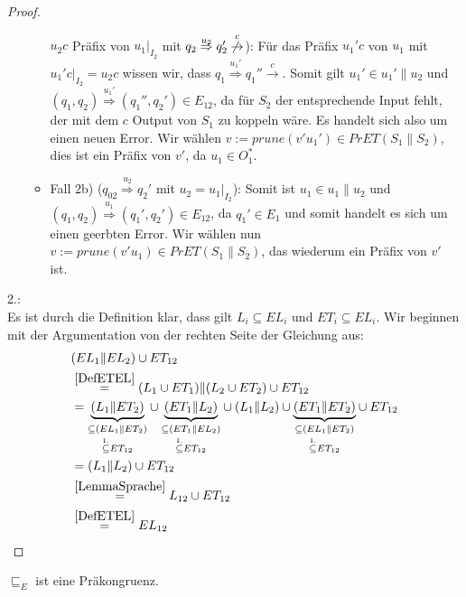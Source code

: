 \begin{proof}
\begin{itemize}
\begin{itemize}
        $u_2c$ Präfix von $u_1|_{I_2}$ mit $q_2 \overset{u_2}{\Rightarrow} q_2'
        \overset{c}{\not{\hspace{-0.1cm}\rightarrow}}$): Für das Präfix $u_1'c$
        von $u_1$ mit $u_1'c|_{I_2}=u_2c$ wissen wir, dass $q_1
        \overset{u_1'}{\Rightarrow} q_1'' \overset{c}{\rightarrow}$. Somit gilt
        $u_1'\in u_1'\|u_2$ und $(q_1,q_2) \overset{u_1'}{\Rightarrow}
        (q_1'',q_2')\in E_{12}$, da für $S_2$ der entsprechende Input fehlt,
        der mit dem $c$ Output von $S_1$ zu koppeln wäre. Es handelt sich also
        um einen neuen Error. Wir wählen $v:=prune(v'u_1')\in PrET(S_1\| S_2)$,
        dies ist ein Präfix von $v'$, da $u_1\in O_1^*$.
      \item Fall 2b) ($q_{02} \overset{u_2}{\Rightarrow} q_2'$ mit
        $u_2=u_1|_{I_2}$): Somit ist $u_1\in u_1\|u_2$ und $(q_1,q_2)
        \overset{u_1}{\Rightarrow} (q_1',q_2')\in E_{12}$, da $q_1'\in E_1$ und
        somit handelt es sich um einen geerbten Error. Wir wählen nun $v:=prune
        (v'u_1)\in PrET(S_1\|S_2)$, das wiederum ein Präfix von $v'$ ist.
    \end{itemize}
  \end{itemize}

  2.:\\
  Es ist durch die Definition klar, dass gilt $L_i\subseteq EL_i$ und
  $ET_i\subseteq EL_i$. Wir beginnen mit der Argumentation von der rechten
  Seite der Gleichung aus:
  \begin{align*}
    &(EL_1\| EL_2)\cup ET_{12}\\
    &\overset{\ref{DefETEL}}{=}(L_1\cup ET_1)\|(L_2\cup ET_2)\cup ET_{12}\\
    &=\underset{\overset{1.}{\subseteq} ET_{12}}{\underset{\subseteq
    (EL_1\|ET_2)}{\underbrace{(L_1\|ET_2)}}} \cup
    \underset{\overset{1.}{\subseteq} ET_{12}}{\underset{\subseteq
    (ET_1\|EL_2)}{\underbrace{(ET_1\|L_2)}}} \cup
    (L_1\|L_2) \cup \underset{\overset{1.}{\subseteq}
    ET_{12}}{\underset{\subseteq (EL_1\|ET_2)}{\underbrace{(ET_1\|ET_2)}}} \cup
    ET_{12}\\
    &=(L_1\|L_2) \cup ET_{12}\\
    &\overset{\ref{LemmaSprache}}{=}L_{12}\cup ET_{12}\\
    &\overset{\ref{DefETEL}}{=}EL_{12}
  \end{align*}
\end{proof}

\begin{prop}[Präkongruenz]
  \label{korPraekongruenz}
  $\sqsubseteq _E$ ist eine Präkongruenz.
\end{prop}

